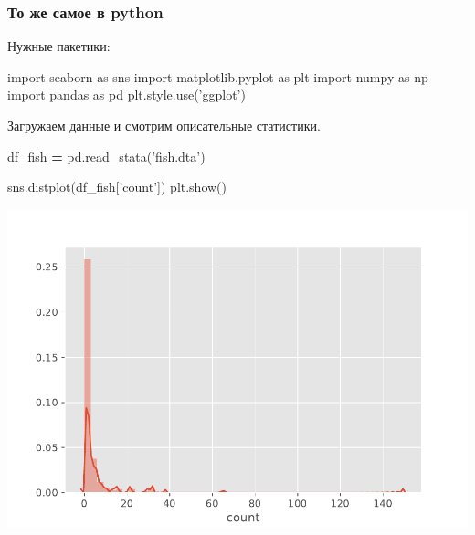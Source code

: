 \documentclass[]{book}
\newenvironment{Shaded}{\begin{snugshade}}{\end{snugshade}}
\newcommand{\ImportTok}[1]{#1}
\newcommand{\NormalTok}[1]{#1}
\newcommand{\OperatorTok}[1]{\textcolor[rgb]{0.81,0.36,0.00}{\textbf{#1}}}
\newcommand{\StringTok}[1]{\textcolor[rgb]{0.31,0.60,0.02}{#1}}
\begin{document}
\hypertarget{----python}{%
\subsubsection{То же самое в python}\label{----python}}

Нужные пакетики:

\begin{Shaded}
\begin{Highlighting}[]
\ImportTok{import}\NormalTok{ seaborn }\ImportTok{as}\NormalTok{ sns}
\ImportTok{import}\NormalTok{ matplotlib.pyplot }\ImportTok{as}\NormalTok{ plt}
\ImportTok{import}\NormalTok{ numpy }\ImportTok{as}\NormalTok{ np}
\ImportTok{import}\NormalTok{ pandas }\ImportTok{as}\NormalTok{ pd}
\NormalTok{plt.style.use(}\StringTok{'ggplot'}\NormalTok{)}
\end{Highlighting}
\end{Shaded}

Загружаем данные и смотрим описательные статистики.

\begin{Shaded}
\begin{Highlighting}[]
\NormalTok{df_fish }\OperatorTok{=}\NormalTok{ pd.read_stata(}\StringTok{'fish.dta'}\NormalTok{)}
\end{Highlighting}
\end{Shaded}

\begin{Shaded}
\begin{Highlighting}[]
\NormalTok{sns.distplot(df_fish[}\StringTok{'count'}\NormalTok{])}
\NormalTok{plt.show()}
\end{Highlighting}
\end{Shaded}

\includegraphics{05-poisreg_files/figure-latex/unnamed-chunk-12-1.pdf}
\end{document}
